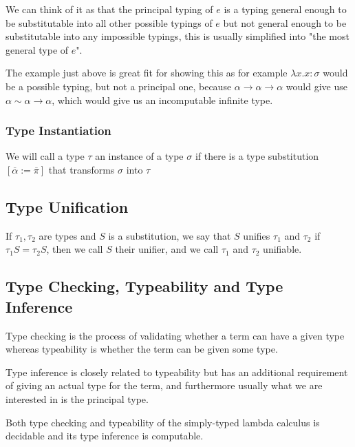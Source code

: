 We can think of it as that the principal typing of $e$ is a typing general enough to be substitutable into all other possible typings of $e$
but not general enough to be substitutable into any impossible typings, this is usually simplified into "the most general type of $e$". %

The example just above %
is great fit for showing this as for example $\lambda x . x : \sigma$ would be a possible typing, but not a principal one, because
$\alpha \rightarrow \alpha \rightarrow \alpha$ would give use $\alpha \sim \alpha \rightarrow \alpha$, which would give us an incomputable
infinite type.

\subsubsection{Type Instantiation}

We will call a type $\tau$ an instance of a type $\sigma$ if there is a type substitution $[\overline{\alpha} := \overline{\pi}]$
that transforms $\sigma$ into $\tau$ %

\subsection{Type Unification}

If $\tau_1, \tau_2$ are types and $S$ is a substitution, we say that $S$ unifies
$\tau_1$ and $\tau_2$ if $\tau_1 S = \tau_2 S$, then we call $S$ their unifier, and we call $\tau_1$ and $\tau_2$ unifiable. %


\subsection{Type Checking, Typeability and Type Inference}

Type checking is the process of validating whether a term can have a given type
whereas typeability is whether the term can be given some type.

Type inference is closely related to typeability but has an additional requirement of giving an actual type for the term, and furthermore
usually what we are interested in is the principal type.

Both type checking and typeability of the simply-typed lambda calculus is decidable and its type inference is computable. %

